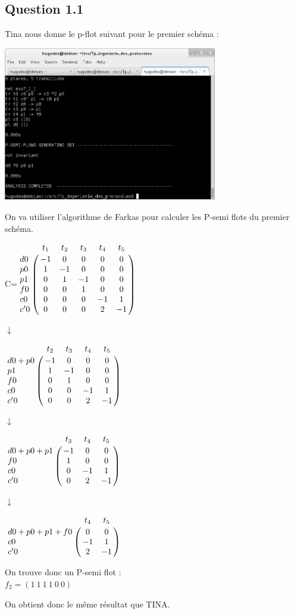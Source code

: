 \subsection{Question 1.1}

Tina nous donne le p-flot suivant pour le premier schéma :\\

\begin{center}

\includegraphics[width=0.7\textwidth]{exo7/tina_7_1.png}\\

\end{center}

On va utiliser l'algorithme de Farkas pour calculer les P-semi flots du premier schéma.

\begin{center}

{\Huge C}\qquad =\qquad $\bordermatrix{
&t_1&t_2&t_3&t_4&t_5\cr
d0&-1&0&0&0&0\cr
p0&1&-1&0&0&0\cr
p1&0&1&-1&0&0\cr
f0&0&0&1&0&0\cr
c0&0&0&0&-1&1\cr
c'0&0&0&0&2&-1\cr
}$

{\Huge $\downarrow$}

$\bordermatrix{
&t_2&t_3&t_4&t_5\cr
d0+p0&-1&0&0&0\cr
p1&1&-1&0&0\cr
f0&0&1&0&0\cr
c0&0&0&-1&1\cr
c'0&0&0&2&-1\cr
}$

{\Huge $\downarrow$}

$\bordermatrix{
&t_3&t_4&t_5\cr
d0+p0+p1&-1&0&0\cr
f0&1&0&0\cr
c0&0&-1&1\cr
c'0&0&2&-1\cr
}$

{\Huge $\downarrow$}

$\bordermatrix{
&t_4&t_5\cr
d0+p0+p1+f0&0&0\cr
c0&-1&1\cr
c'0&2&-1\cr
}$


\vspace{1cm}

On trouve donc un P-semi flot :\\
$f_2 = (1\ 1\ 1\ 1\ 0\ 0)$

On obtient donc le même résultat que TINA.

\end{center}



